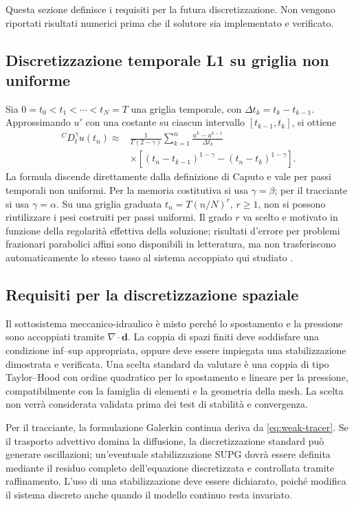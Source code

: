 Questa sezione definisce i requisiti per la futura discretizzazione. Non vengono riportati risultati numerici prima che il solutore sia implementato e verificato.

\subsection{Discretizzazione temporale L1 su griglia non uniforme}
Sia $0=t_0<t_1<\cdots<t_N=T$ una griglia temporale, con $\Delta t_k=t_k-t_{k-1}$. Approssimando $u'$ con una costante su ciascun intervallo $[t_{k-1},t_k]$, si ottiene
\begin{equation}
\begin{aligned}
{}^C D_t^\gamma u(t_n)\approx{}&\frac{1}{\Gamma(2-\gamma)}\sum_{k=1}^{n}
\frac{u^k-u^{k-1}}{\Delta t_k}\\[-1mm]
&\times\left[(t_n-t_{k-1})^{1-\gamma}-(t_n-t_k)^{1-\gamma}\right].
\end{aligned}
\label{eq:L1-nonuniform}
\end{equation}
La formula discende direttamente dalla definizione di Caputo e vale per passi temporali non uniformi. Per la memoria costitutiva si usa $\gamma=\beta$; per il tracciante si usa $\gamma=\alpha$. Su una griglia graduata $t_n=T(n/N)^r$, $r\ge1$, non si possono riutilizzare i pesi costruiti per passi uniformi. Il grado $r$ va scelto e motivato in funzione della regolarità effettiva della soluzione; risultati d'errore per problemi frazionari parabolici affini sono disponibili in letteratura, ma non trasferiscono automaticamente lo stesso tasso al sistema accoppiato qui studiato \citep{Kopteva2019}.

\subsection{Requisiti per la discretizzazione spaziale}
Il sottosistema meccanico-idraulico è misto perché lo spostamento e la pressione sono accoppiati tramite $\nabla\cdot\mathbf d$. La coppia di spazi finiti deve soddisfare una condizione inf--sup appropriata, oppure deve essere impiegata una stabilizzazione dimostrata e verificata. Una scelta standard da valutare è una coppia di tipo Taylor--Hood con ordine quadratico per lo spostamento e lineare per la pressione, compatibilmente con la famiglia di elementi e la geometria della mesh. La scelta non verrà considerata validata prima dei test di stabilità e convergenza.

Per il tracciante, la formulazione Galerkin continua deriva da \eqref{eq:weak-tracer}. Se il trasporto advettivo domina la diffusione, la discretizzazione standard può generare oscillazioni; un'eventuale stabilizzazione SUPG dovrà essere definita mediante il residuo completo dell'equazione discretizzata e controllata tramite raffinamento. L'uso di una stabilizzazione deve essere dichiarato, poiché modifica il sistema discreto anche quando il modello continuo resta invariato.

